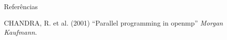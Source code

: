 \documentclass[aspectratio=169]{beamer}
\begin{document}
\begin{frame}[allowframebreaks]{Referências}
\footnotesize
{
  \begin{thebibliography}{99} %
   CHANDRA, R. et al. (2001)
  \newblock “Parallel programming in openmp”
  \newblock \emph{Morgan Kaufmann}.


  \end{thebibliography}
}



\end{frame}

\end{document}
